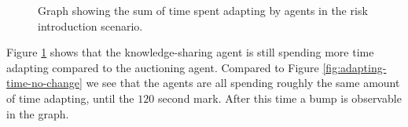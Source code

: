 \begin{figure}[H]
    \hspace*{-1cm}
    \centering
        
    \caption{Graph showing the sum of time spent adapting by agents in the risk introduction scenario.}
    \label{fig:adapting-time-risk-introduction}
\end{figure}

Figure \ref{fig:adapting-time-risk-introduction} shows that the knowledge-sharing agent is still spending more time adapting compared to the auctioning agent. Compared to Figure \ref{fig:adapting-time-no-change} we see that the agents are all spending roughly the same amount of time adapting, until the $120$ second mark. After this time a bump is observable in the graph.
